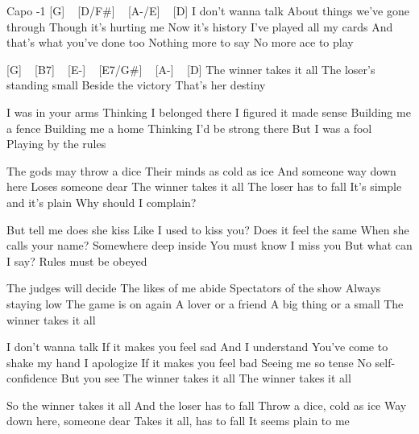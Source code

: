 Capo -1
[G] ~ [D/F#] ~ [A-/E] ~ [D]
I don't wanna talk
About things we've gone through
Though it's hurting me
Now it's history
I've played all my cards
And that's what you've done too
Nothing more to say
No more ace to play

[G] ~ [B7] ~ [E-] ~ [E7/G#] ~ [A-] ~ [D]
The winner takes it all
The loser's standing small
Beside the victory
That's her destiny

I was in your arms
Thinking I belonged there
I figured it made sense
Building me a fence
Building me a home
Thinking I'd be strong there
But I was a fool
Playing by the rules

The gods may throw a dice
Their minds as cold as ice
And someone way down here
Loses someone dear
The winner takes it all
The loser has to fall
It's simple and it's plain
Why should I complain?

But tell me does she kiss
Like I used to kiss you?
Does it feel the same
When she calls your name?
Somewhere deep inside
You must know I miss you
But what can I say?
Rules must be obeyed

The judges will decide
The likes of me abide
Spectators of the show
Always staying low
The game is on again
A lover or a friend
A big thing or a small
The winner takes it all

I don't wanna talk
If it makes you feel sad
And I understand
You've come to shake my hand
I apologize
If it makes you feel bad
Seeing me so tense
No self-confidence
But you see
The winner takes it all
The winner takes it all

So the winner takes it all
And the loser has to fall
Throw a dice, cold as ice
Way down here, someone dear
Takes it all, has to fall
It seems plain to me 